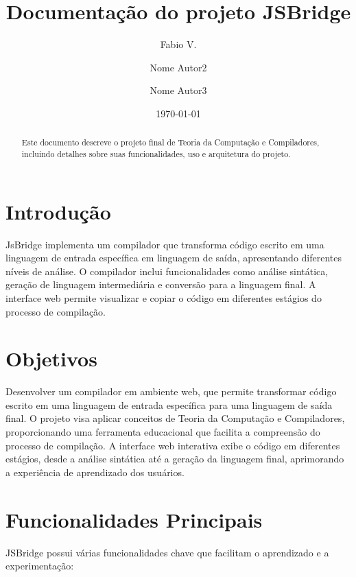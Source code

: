 \documentclass[a4paper,12pt]{article}
\title{Documentação do projeto JSBridge}
\author{Fabio V. \and Nome Autor2 \and Nome Autor3}
\date{\today}
\begin{document}
\maketitle

\begin{abstract}
Este documento descreve o projeto final de Teoria da Computação e Compiladores, incluindo detalhes sobre suas funcionalidades, uso e arquitetura do projeto.
\end{abstract}

\tableofcontents
\newpage

\section{Introdução}

JsBridge implementa um compilador que transforma código escrito em uma linguagem de entrada específica em linguagem de saída, apresentando diferentes níveis de análise. O compilador inclui funcionalidades como análise sintática, geração de linguagem intermediária e conversão para a linguagem final. A interface web permite visualizar e copiar o código em diferentes estágios do processo de compilação.

\section{Objetivos}

Desenvolver um compilador em ambiente web, que permite transformar código escrito em uma linguagem de entrada específica para uma linguagem de saída final. O projeto visa aplicar conceitos de Teoria da Computação e Compiladores, proporcionando uma ferramenta educacional que facilita a compreensão do processo de compilação. A interface web interativa exibe o código em diferentes estágios, desde a análise sintática até a geração da linguagem final, aprimorando a experiência de aprendizado dos usuários.

\section{Funcionalidades Principais}

JSBridge possui várias funcionalidades chave que facilitam o aprendizado e a experimentação:
\end{document}
